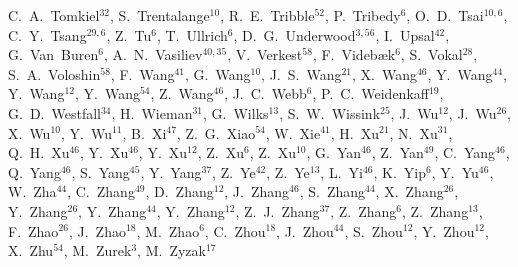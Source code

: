 {C.~A.~Tomkiel$^{32}$,
S.~Trentalange$^{10}$,
R.~E.~Tribble$^{52}$,
P.~Tribedy$^{6}$,
O.~D.~Tsai$^{10,6}$,
C.~Y.~Tsang$^{29,6}$,
Z.~Tu$^{6}$,
T.~Ullrich$^{6}$,
D.~G.~Underwood$^{3,56}$,
I.~Upsal$^{42}$,
G.~Van~Buren$^{6}$,
A.~N.~Vasiliev$^{40,35}$,
V.~Verkest$^{58}$,
F.~Videb{\ae}k$^{6}$,
S.~Vokal$^{28}$,
S.~A.~Voloshin$^{58}$,
F.~Wang$^{41}$,
G.~Wang$^{10}$,
J.~S.~Wang$^{21}$,
X.~Wang$^{46}$,
Y.~Wang$^{44}$,
Y.~Wang$^{12}$,
Y.~Wang$^{54}$,
Z.~Wang$^{46}$,
J.~C.~Webb$^{6}$,
P.~C.~Weidenkaff$^{19}$,
G.~D.~Westfall$^{34}$,
H.~Wieman$^{31}$,
G.~Wilks$^{13}$,
S.~W.~Wissink$^{25}$,
J.~Wu$^{12}$,
J.~Wu$^{26}$,
X.~Wu$^{10}$,
Y.~Wu$^{11}$,
B.~Xi$^{47}$,
Z.~G.~Xiao$^{54}$,
W.~Xie$^{41}$,
H.~Xu$^{21}$,
N.~Xu$^{31}$,
Q.~H.~Xu$^{46}$,
Y.~Xu$^{46}$,
Y.~Xu$^{12}$,
Z.~Xu$^{6}$,
Z.~Xu$^{10}$,
G.~Yan$^{46}$,
Z.~Yan$^{49}$,
C.~Yang$^{46}$,
Q.~Yang$^{46}$,
S.~Yang$^{45}$,
Y.~Yang$^{37}$,
Z.~Ye$^{42}$,
Z.~Ye$^{13}$,
L.~Yi$^{46}$,
K.~Yip$^{6}$,
Y.~Yu$^{46}$,
W.~Zha$^{44}$,
C.~Zhang$^{49}$,
D.~Zhang$^{12}$,
J.~Zhang$^{46}$,
S.~Zhang$^{44}$,
X.~Zhang$^{26}$,
Y.~Zhang$^{26}$,
Y.~Zhang$^{44}$,
Y.~Zhang$^{12}$,
Z.~J.~Zhang$^{37}$,
Z.~Zhang$^{6}$,
Z.~Zhang$^{13}$,
F.~Zhao$^{26}$,
J.~Zhao$^{18}$,
M.~Zhao$^{6}$,
C.~Zhou$^{18}$,
J.~Zhou$^{44}$,
S.~Zhou$^{12}$,
Y.~Zhou$^{12}$,
X.~Zhu$^{54}$,
M.~Zurek$^{3}$,
M.~Zyzak$^{17}$
}

\address{\rm{(STAR Collaboration)}}

